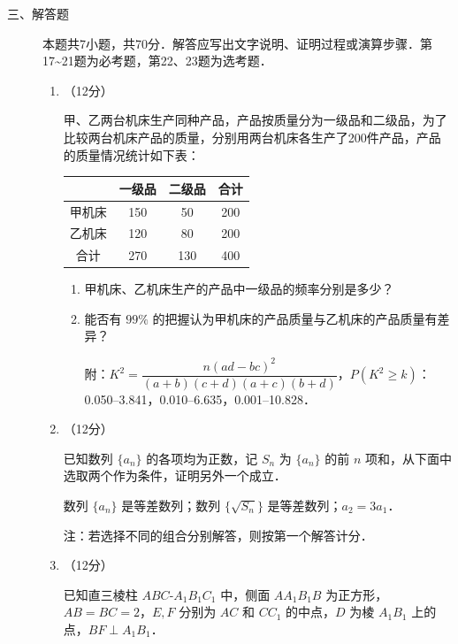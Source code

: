 \begin{description}
    \item[三、解答题] 本题共7小题，共70分．解答应写出文字说明、证明过程或演算步骤．第17\textasciitilde21题为必考题，第22、23题为选考题．
    \begin{enumerate}[leftmargin=5pt]
      \addtocounter{enumi}{+16}
        \item （12分）

        甲、乙两台机床生产同种产品，产品按质量分为一级品和二级品，为了比较两台机床产品的质量，分别用两台机床各生产了200件产品，产品的质量情况统计如下表：

        {\centering\begin{tabular}{c|c|c|c}
        \hline
        & 一级品 & 二级品 & 合计 \\
        \hline
        甲机床 & 150 & 50 & 200 \\
        \hline
        乙机床 & 120 & 80 & 200 \\
        \hline
        合计 & 270 & 130 & 400 \\
        \hline
        \end{tabular}\par}

        \begin{enumerate}[label=(\arabic*)]
            \item 甲机床、乙机床生产的产品中一级品的频率分别是多少？
            \item 能否有 $99\%$ 的把握认为甲机床的产品质量与乙机床的产品质量有差异？

            附：$K^2=\dfrac{n(ad-bc)^2}{(a+b)(c+d)(a+c)(b+d)}$，$P(K^2\geqslant k)$：0.050--3.841，0.010--6.635，0.001--10.828．
        \end{enumerate}

        \item （12分）

        已知数列 $\{a_n\}$ 的各项均为正数，记 $S_n$ 为 $\{a_n\}$ 的前 $n$ 项和，从下面中选取两个作为条件，证明另外一个成立．

        数列 $\{a_n\}$ 是等差数列；数列 $\{\sqrt{S_n}\}$ 是等差数列；$a_2=3a_1$．

        注：若选择不同的组合分别解答，则按第一个解答计分．

        \item （12分）

        已知直三棱柱 $ABC$-$A_1B_1C_1$ 中，侧面 $AA_1B_1B$ 为正方形，$AB=BC=2$，$E,F$ 分别为 $AC$ 和 $CC_1$ 的中点，$D$ 为棱 $A_1B_1$ 上的点，$BF\perp A_1B_1$．


\end{enumerate}
\end{description}
